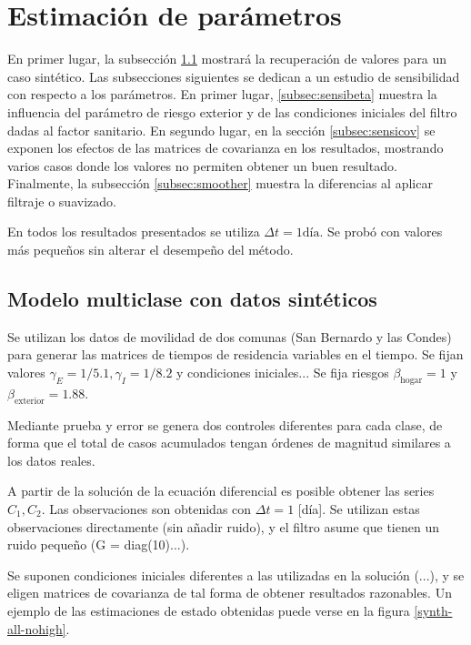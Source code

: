 \section{Estimación de parámetros}\label{sec:estimacion-results}

En primer lugar, la subsección \ref{subsec:sintetico} mostrará la recuperación de valores para un caso sintético. Las subsecciones siguientes se dedican a un estudio de sensibilidad con respecto a los parámetros. En primer lugar, \ref{subsec:sensibeta} muestra la influencia del parámetro de riesgo exterior y de las condiciones iniciales del filtro dadas al factor sanitario. En segundo lugar, en la sección \ref{subsec:sensicov} se exponen los efectos de las matrices de covarianza en los resultados, mostrando varios casos donde los valores no permiten obtener un buen resultado. Finalmente, la subsección \ref{subsec:smoother} muestra la diferencias al aplicar filtraje o suavizado.

En todos los resultados presentados se utiliza \(\Delta t = 1 \text{día}\). Se probó con valores más pequeños sin alterar el desempeño del método.

\subsection{Modelo multiclase con datos sintéticos} \label{subsec:sintetico}

Se utilizan los datos de movilidad de dos comunas (San Bernardo y las Condes) para generar las matrices de tiempos de residencia variables en el tiempo. Se fijan valores \(\gamma_E = 1/5.1, \gamma_I = 1/8.2\) y condiciones iniciales... Se fija riesgos \(\beta_{\text{hogar}} = 1\) y \(\beta_{\text{exterior}} = 1.88\). 

Mediante prueba y error se genera dos controles diferentes para cada clase, de forma que el total de casos acumulados tengan órdenes de magnitud similares a los datos reales.

A partir de la solución de la ecuación diferencial es posible obtener las series \(C_1, C_2\). Las observaciones son obtenidas con \(\Delta t = 1\) [día]. Se utilizan estas observaciones directamente (sin añadir ruido), y el filtro asume que tienen un ruido pequeño (G = diag(10)...). 

Se suponen condiciones iniciales diferentes a las utilizadas en la solución (...), y se eligen matrices de covarianza de tal forma de obtener resultados razonables. Un ejemplo de las estimaciones de estado obtenidas puede verse en la figura \ref{synth-all-nohigh}.



